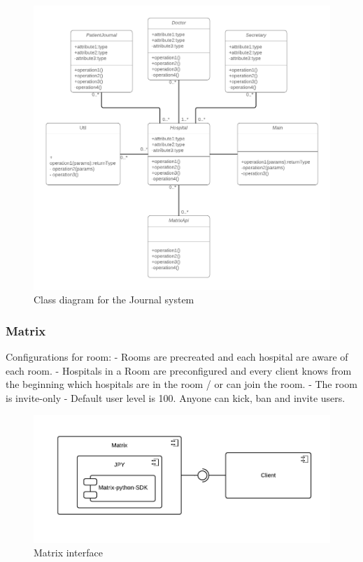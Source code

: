 \begin{figure}[H] 
	\hspace*{-1.7cm}
	\centering
	\includegraphics[width=16cm]{figures/journalsystem_class.png}
	\caption{Class diagram for the Journal system}
	\label{fig:journalsystem}
\end{figure}



\subsubsection{Matrix}






Configurations for room:
- Rooms are precreated and each hospital are aware of each room. 
- Hospitals in a Room are preconfigured and every client knows from the beginning which hospitals are in the room / or can join the room.
- The room is invite-only
- Default user level is 100. Anyone can kick, ban and invite users. 


\begin{figure}[H] 
	\hspace*{-1cm}
	\centering
	\includegraphics[width=14cm]{figures/matrix_component.png}
	\caption{Matrix interface}
	\label{fig:matrix_component}
\end{figure}




